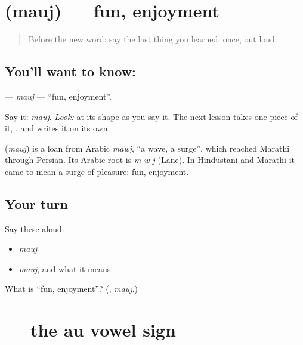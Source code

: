 \section[\texorpdfstring{\mr{मौज} (mauj)}{मौज (mauj)}]{ (mauj) — fun, enjoyment}

\label{lesson:MR-C56-mauj}



\begin{quote}
Before the new word: say the last thing you learned, once, out loud.
\end{quote}

\subsection*{You'll want to know: }
\textbf{} — \emph{mauj} — \textquotedblleft{}fun, enjoyment\textquotedblright{}.

Say it: \emph{mauj}. \emph{Look:} at its shape as you say it. The next lesson takes one piece of it, \textbf{}, and writes it on its own.

\begin{cousinweb}
\textbf{} (\emph{mauj}) is a loan from Arabic \emph{mawj}, \textquotedblleft{}a wave, a surge\textquotedblright{}, which reached Marathi through Persian. Its Arabic root is \emph{m-w-j} (Lane). In Hindustani and Marathi it came to mean a surge of pleasure: fun, enjoyment.
\end{cousinweb}

\subsection*{Your turn}
Say these aloud:

\begin{itemize}
\raggedright
  \item \emph{mauj}
  \item \emph{mauj}, and what it means
\end{itemize}

\begin{tcolorbox}[breakable,colback=teal!4,colframe=teal!35!black,title={Before you move on}]
What is \textquotedblleft{}fun, enjoyment\textquotedblright{}? (\textbf{}, \emph{mauj}.)
\end{tcolorbox}
\section[\texorpdfstring{\mr{ौ} (-au)}{ौ (-au)}]{ — the au vowel sign}

